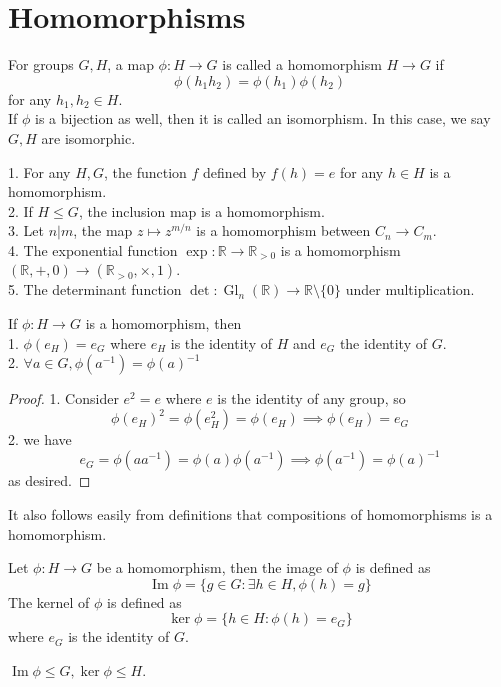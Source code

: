 \section{Homomorphisms}
\begin{definition}
    For groups $G,H$, a map $\phi:H\to G$ is called a homomorphism $H\to G$ if
    $$\phi(h_1h_2)=\phi(h_1)\phi(h_2)$$
    for any $h_1,h_2\in H$.\\
    If $\phi$ is a bijection as well, then it is called an isomorphism.
    In this case, we say $G,H$ are isomorphic.
\end{definition}
\begin{example}
    1. For any $H,G$, the function $f$ defined by $f(h)=e$ for any $h\in H$ is a homomorphism.\\
    2. If $H\le G$, the inclusion map is a homomorphism.\\
    3. Let $n|m$, the map $z\mapsto z^{m/n}$ is a homomorphism between $C_n\to C_m$.\\
    4. The exponential function $\exp:\mathbb R\to\mathbb R_{>0}$ is a homomorphism $(\mathbb R,+,0)\to(\mathbb R_{>0},\times,1)$.\\
    5. The determinant function $\det:\operatorname{Gl}_n(\mathbb R)\to\mathbb R\setminus\{0\}$ under multiplication.
\end{example}
\begin{lemma}
    If $\phi:H\to G$ is a homomorphism, then\\
    1. $\phi(e_H)=e_G$ where $e_H$ is the identity of $H$ and $e_G$ the identity of $G$.\\
    2. $\forall a\in G,\phi(a^{-1})=\phi(a)^{-1}$
\end{lemma}
\begin{proof}
    1. Consider $e^2=e$ where $e$ is the identity of any group, so
    $$\phi(e_H)^2=\phi(e_H^2)=\phi(e_H)\implies \phi(e_H)=e_G$$
    2. we have
    $$e_G=\phi(aa^{-1})=\phi(a)\phi(a^{-1})\implies \phi(a^{-1})=\phi(a)^{-1}$$
    as desired.
\end{proof}
It also follows easily from definitions that compositions of homomorphisms is a homomorphism.
\begin{definition}
    Let $\phi:H\to G$ be a homomorphism, then the image of $\phi$ is defined as
    $$\operatorname{Im}\phi=\{g\in G:\exists h\in H, \phi(h)=g\}$$
    The kernel of $\phi$ is defined as
    $$\ker\phi=\{h\in H:\phi(h)=e_G\}$$
    where $e_G$ is the identity of $G$.
\end{definition}
\begin{proposition}
    $\operatorname{Im}\phi\le G,\ker\phi\le H$.
\end{proposition}
